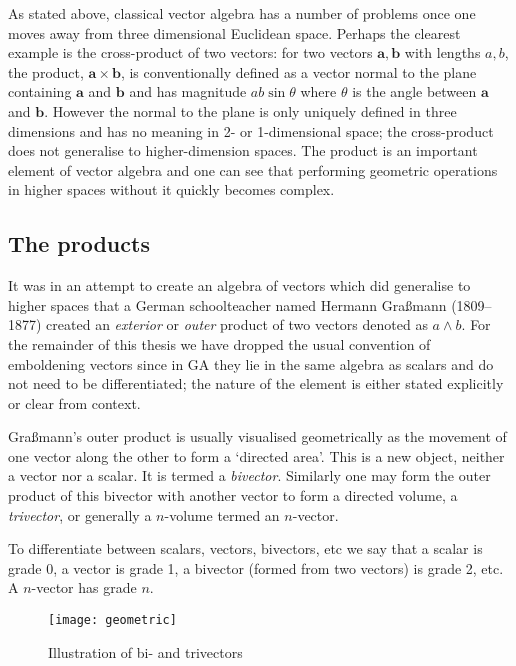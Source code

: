 As stated above, classical vector algebra has a number of problems once one
moves away from three dimensional Euclidean space. Perhaps the clearest
example is the cross-product of two vectors: for two
vectors $\mathbf{a}, \mathbf{b}$ with lengths $a, b$, the product, $\mathbf{a} \times
\mathbf{b}$, is conventionally defined as a vector normal to the plane
containing $\mathbf{a}$ and $\mathbf{b}$ and has magnitude $ab\sin\theta$
where $\theta$ is the angle between $\mathbf{a}$ and $\mathbf{b}$. However the
normal to the plane is only uniquely defined in three dimensions and has no
meaning in 2- or 1-dimensional space; the cross-product does not generalise to
higher-dimension spaces. The product is an important element of vector algebra
and one can see that performing geometric operations in higher spaces without
it quickly becomes complex.

\subsection{The products}

It was in an attempt\cite{GA:grassmann} to create an algebra of vectors which
did generalise to higher spaces that a German schoolteacher named Hermann
Gra{\ss}mann (1809--1877) created an \emph{exterior} or \emph{outer} product
of two vectors denoted as $a \wedge b$. For the remainder of this thesis we
have dropped the usual convention of emboldening vectors since in GA they lie
in the same algebra as scalars and do not need to be differentiated; the
nature of the element is either stated explicitly or clear from context.

Gra{\ss}mann's outer product is usually visualised geometrically as the
movement of one vector along the other to form a `directed area'. This is a
new object, neither a vector nor a scalar. It is termed a \emph{bivector}.
Similarly one may form the outer product of this bivector with another vector
to form a directed volume, a \emph{trivector}, or generally a $n$-volume
termed an $n$-vector. 

To differentiate between scalars, vectors, bivectors, etc we say that a scalar
is grade 0, a vector is grade 1, a bivector (formed from two vectors) is grade
2, etc. A $n$-vector has grade $n$.

\begin{figure}
\centering
\texttt{[image: geometric]}
\caption{Illustration of bi- and trivectors\label{fig:geometric}}
\end{figure}

